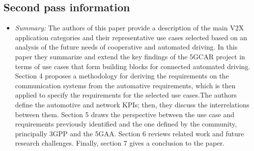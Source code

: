 \documentclass[letterpaper,twocolumn,10pt]{article}
\begin{document}
\subsection{Second pass information}
\label{sec:second}
\begin{itemize}

\item {\it Summary:} 
The authors of this paper provide a description of the main V2X application categories and their representative use
cases selected based on an analysis of the future needs of cooperative and automated driving. In this paper they 
summarize and extend the key findings of the 5GCAR project in terms of use cases that form building blocks for 
connected automated driving. Section 4 proposes a methodology for deriving the requirements on the communication
systems from the automative requirements, which is then applied to specify the requirements for the selected use 
cases.The authors define the automotive and network KPIs; then, they discuss the interrelations between them.
Section 5 draws the perspective between the use case and requirements previously identified and the one defined 
by the community, principally 3GPP and the 5GAA. Section 6 reviews related work and future research challenges.
Finally, section 7 gives a conclusion to the paper.

\end{itemize}
\end{document}
